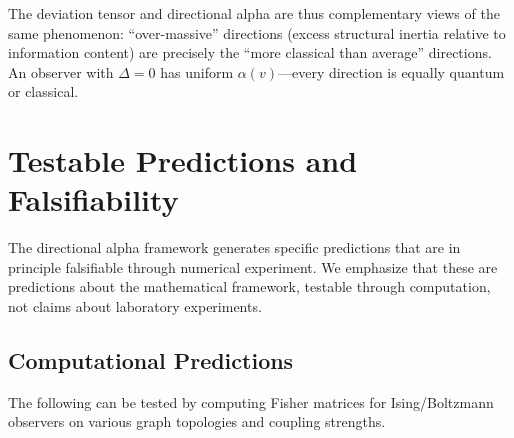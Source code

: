 \documentclass[11pt,a4paper]{article}
\theoremstyle{plain}
\theoremstyle{definition}
\begin{document}
The deviation tensor and directional alpha are thus complementary
views of the same phenomenon: ``over-massive'' directions (excess
structural inertia relative to information content) are precisely
the ``more classical than average'' directions.  An observer with
$\Delta = 0$ has uniform $\alpha(v)$---every direction is equally
quantum or classical.



\section{Testable Predictions and Falsifiability}
\label{sec:predictions}

The directional alpha framework generates specific predictions
that are in principle falsifiable through numerical experiment.
We emphasize that these are predictions about the mathematical
framework, testable through computation, not claims about
laboratory experiments.

\subsection{Computational Predictions}

The following can be tested by computing Fisher matrices for
Ising/Boltzmann observers on various graph topologies and coupling
strengths.
\end{document}
